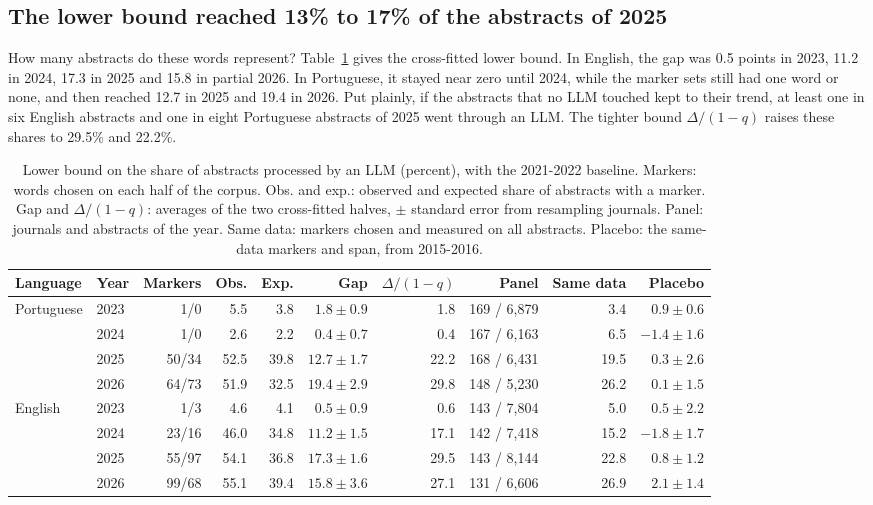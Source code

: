 \documentclass[12pt]{article}
\begin{document}
\subsection{The lower bound reached 13\% to 17\% of the abstracts of 2025}
\label{sec:bound}

How many abstracts do these words represent? Table~\ref{tab:bound} gives the cross-fitted lower
bound. In English, the gap was 0.5 points in 2023, 11.2 in 2024, 17.3 in 2025 and 15.8 in partial
2026. In Portuguese, it stayed near zero until 2024, while the marker sets still had one word or
none, and then reached 12.7 in 2025 and 19.4 in 2026. Put plainly, if the abstracts that no LLM
touched kept to their trend, at least one in six English abstracts and one in eight Portuguese
abstracts of 2025 went through an LLM. The tighter bound $\Delta/(1-q)$ raises these shares to
29.5\% and 22.2\%.

\begin{table}[!htb]
  \centering
  \caption{Lower bound on the share of abstracts processed by an LLM (percent), with the 2021-2022
    baseline. Markers: words chosen on each half of the corpus. Obs. and exp.: observed and expected
    share of abstracts with a marker. Gap and $\Delta/(1-q)$: averages of the two cross-fitted
    halves, $\pm$ standard error from resampling journals. Panel: journals and abstracts of the
    year. Same data: markers chosen and measured on all abstracts. Placebo: the same-data markers
    and span, from 2015-2016.}
  \label{tab:bound}
  \footnotesize
  \setlength{\tabcolsep}{3pt}
  \begin{tabular}{llrrrrrrrr}
    \toprule
    Language & Year & Markers & Obs. & Exp. & Gap & $\Delta/(1-q)$ & Panel & Same data & Placebo \\
    \midrule
    Portuguese & 2023 & 1/0   & 5.5  & 3.8  & $1.8 \pm 0.9$  & 1.8  & 169 / 6,879 & 3.4  & $0.9 \pm 0.6$ \\
               & 2024 & 1/0   & 2.6  & 2.2  & $0.4 \pm 0.7$  & 0.4  & 167 / 6,163 & 6.5  & $-1.4 \pm 1.6$ \\
               & 2025 & 50/34 & 52.5 & 39.8 & $12.7 \pm 1.7$ & 22.2 & 168 / 6,431 & 19.5 & $0.3 \pm 2.6$ \\
               & 2026 & 64/73 & 51.9 & 32.5 & $19.4 \pm 2.9$ & 29.8 & 148 / 5,230 & 26.2 & $0.1 \pm 1.5$ \\
    \midrule
    English    & 2023 & 1/3   & 4.6  & 4.1  & $0.5 \pm 0.9$  & 0.6  & 143 / 7,804 & 5.0  & $0.5 \pm 2.2$ \\
               & 2024 & 23/16 & 46.0 & 34.8 & $11.2 \pm 1.5$ & 17.1 & 142 / 7,418 & 15.2 & $-1.8 \pm 1.7$ \\
               & 2025 & 55/97 & 54.1 & 36.8 & $17.3 \pm 1.6$ & 29.5 & 143 / 8,144 & 22.8 & $0.8 \pm 1.2$ \\
               & 2026 & 99/68 & 55.1 & 39.4 & $15.8 \pm 3.6$ & 27.1 & 131 / 6,606 & 26.9 & $2.1 \pm 1.4$ \\
    \bottomrule
  \end{tabular}
\end{table}
\end{document}
